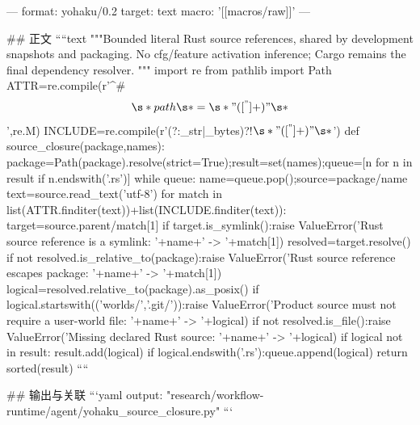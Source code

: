 ---
format: yohaku/0.2
target: text
macro: '[[macros/raw]]'
---

## 正文
````text
"""Bounded literal Rust source references, shared by development snapshots and packaging.
No cfg/feature activation inference; Cargo remains the final dependency resolver.
"""
import re
from pathlib import Path
ATTR=re.compile(r'^\s*#\[\s*path\s*=\s*"([^"]+)"\s*\]',re.M)
INCLUDE=re.compile(r'\binclude(?:_str|_bytes)?!\(\s*"([^"]+)"\s*\)')
def source_closure(package,names):
 package=Path(package).resolve(strict=True);result=set(names);queue=[n for n in result if n.endswith('.rs')]
 while queue:
  name=queue.pop();source=package/name
  text=source.read_text('utf-8')
  for match in list(ATTR.finditer(text))+list(INCLUDE.finditer(text)):
   target=source.parent/match[1]
   if target.is_symlink():raise ValueError('Rust source reference is a symlink: '+name+' -> '+match[1])
   resolved=target.resolve()
   if not resolved.is_relative_to(package):raise ValueError('Rust source reference escapes package: '+name+' -> '+match[1])
   logical=resolved.relative_to(package).as_posix()
   if logical.startswith(('worlds/','.git/')):raise ValueError('Product source must not require a user-world file: '+name+' -> '+logical)
   if not resolved.is_file():raise ValueError('Missing declared Rust source: '+name+' -> '+logical)
   if logical not in result:
    result.add(logical)
    if logical.endswith('.rs'):queue.append(logical)
 return sorted(result)
````

## 输出与关联
```yaml
output: "research/workflow-runtime/agent/yohaku_source_closure.py"
```

